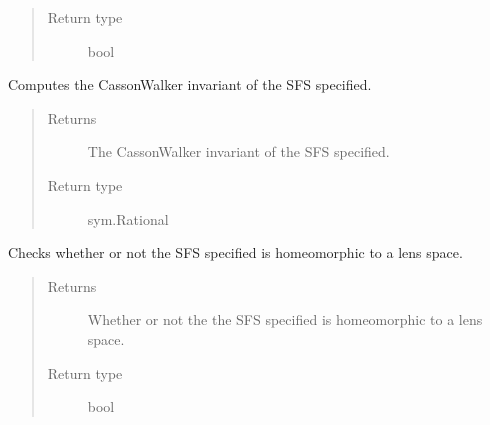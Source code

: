\documentclass[letterpaper,10pt,english]{sphinxmanual}
\begin{document}
\begin{fulllineitems}
\begin{fulllineitems}
\begin{quote}
\begin{description}
\item[{Return type}] \leavevmode
\sphinxAtStartPar
bool

\end{description}\end{quote}

\end{fulllineitems}


\begin{fulllineitems}
\label{\detokenize{soapy:soapy.SFS.casson_walker}}
\sphinxAtStartPar
Computes the Casson\sphinxhyphen{}Walker invariant of the SFS specified.
\begin{quote}\begin{description}
\item[{Returns}] \leavevmode
\sphinxAtStartPar
The Casson\sphinxhyphen{}Walker invariant of the SFS specified.

\item[{Return type}] \leavevmode
\sphinxAtStartPar
sym.Rational

\end{description}\end{quote}

\end{fulllineitems}


\begin{fulllineitems}
\label{\detokenize{soapy:soapy.SFS.is_lens_space}}
\sphinxAtStartPar
Checks whether or not the SFS specified is homeomorphic to a lens space.
\begin{quote}\begin{description}
\item[{Returns}] \leavevmode
\sphinxAtStartPar
Whether or not the the SFS specified is homeomorphic to a lens space.

\item[{Return type}] \leavevmode
\sphinxAtStartPar
bool

\end{description}\end{quote}

\end{fulllineitems}


\end{fulllineitems}
\end{document}
